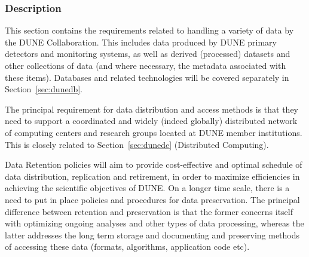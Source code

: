 \subsubsection{Description}
This section contains the requirements related to handling a variety of data by the DUNE Collaboration. This includes data produced by DUNE primary detectors and monitoring systems, as well as derived (processed) datasets and other collections of data (and where necessary, the metadata associated with these items). Databases and related technologies will be covered separately in Section~\ref{sec:dunedb}.

The principal requirement for data distribution and access methods is that they need to support a coordinated and widely (indeed globally) distributed network of computing centers and research groups located at DUNE member institutions. This is closely related to Section~\ref{sec:dunedc} (Distributed Computing).

Data Retention policies will aim to provide cost-effective and optimal schedule of data distribution, replication and retirement, in order to maximize
efficiencies in achieving the scientific objectives of DUNE. On a longer time scale, there is a need to put in place policies and procedures for data preservation.
The principal difference between retention and preservation is that the former concerns itself with optimizing ongoing analyses and other types of data processing,
whereas the latter addresses the long term storage and documenting and preserving methods of accessing these data (formats, algorithms, application code etc).



